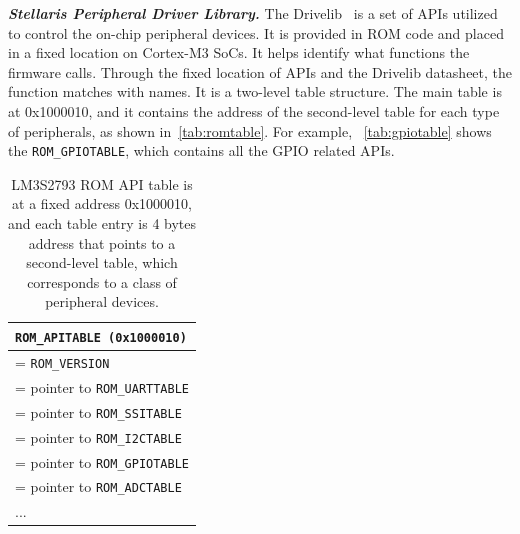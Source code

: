 \textbf{\textit{Stellaris Peripheral Driver Library.}} The Drivelib~\cite{lm3s2793rom} is a set of APIs utilized to control the on-chip peripheral devices. It is provided in ROM code and placed in a fixed location on Cortex-M3 SoCs. It helps identify what functions the firmware calls. Through the fixed location of APIs and the Drivelib datasheet, the function matches with names. It is a two-level table structure. The main table is at 0x1000010, and it contains the address of the second-level table for each type of peripherals, as shown in~\autoref{tab:romtable}. For example, ~\autoref{tab:gpiotable} shows the \texttt{ROM\_GPIOTABLE}, which contains all the GPIO related APIs.

\begin{center}
	\begin{table}
		\small
		\begin{tabular}{|p{7.2cm}|} 
			\hline
			\texttt{ROM\_APITABLE (0x1000010)} \\ %
			\hline
			[0] = \texttt{ROM\_VERSION} \\
			\hline
			[1] = pointer to \texttt{ROM\_UARTTABLE} \\
			\hline
			[2] = pointer to \texttt{ROM\_SSITABLE} \\
			\hline
			[3] = pointer to \texttt{ROM\_I2CTABLE} \\
			\hline
			[4] = pointer to \texttt{ROM\_GPIOTABLE} \\
			\hline
			[5] = pointer to \texttt{ROM\_ADCTABLE} \\
			\hline
			... \\ 
			\hline
		\end{tabular}
		\caption{LM3S2793 ROM API table is at a fixed address 0x1000010, and each table entry is 4 bytes address that points to a second-level table, which corresponds to a class of peripheral devices.}
		\label{tab:romtable}
	\end{table}
\end{center}

